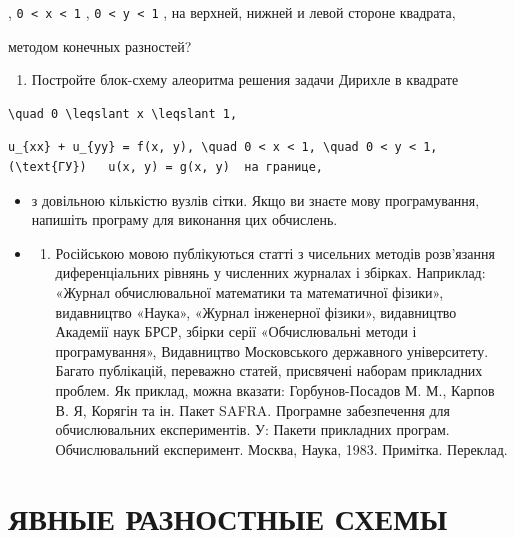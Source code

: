 \documentclass[
  ukrainian,
]{article}
\providecommand{\tightlist}{%
  \setlength{\itemsep}{0pt}\setlength{\parskip}{0pt}}
\begin{document}
, \texttt{0\ \textless{}\ x\ \textless{}\ 1} ,
\texttt{0\ \textless{}\ y\ \textless{}\ 1} , на верхней, нижней и левой
стороне квадрата,

методом конечных разностей?

\begin{enumerate}
\def\labelenumi{\arabic{enumi}.}
\setcounter{enumi}{5}
\tightlist
\item
  Постройте блок-схему алеоритма решения задачи Дирихле в квадрате
\end{enumerate}

\begin{verbatim}
\quad 0 \leqslant x \leqslant 1,
\end{verbatim}

\begin{verbatim}
u_{xx} + u_{yy} = f(x, y), \quad 0 < x < 1, \quad 0 < y < 1,   (\text{ГУ})   u(x, y) = g(x, y)  на границе,
\end{verbatim}

\begin{itemize}
\item
  з довільною кількістю вузлів сітки. Якщо ви знаєте мову програмування,
  напишіть програму для виконання цих обчислень.
\item
  \begin{enumerate}
  \def\labelenumi{\arabic{enumi})}
  \tightlist
  \item
    Російською мовою публікуються статті з чисельних методів розв'язання
    диференціальних рівнянь у численних журналах і збірках. Наприклад:
    «Журнал обчислювальної математики та математичної фізики»,
    видавництво «Наука», «Журнал інженерної фізики», видавництво
    Академії наук БРСР, збірки серії «Обчислювальні методи і
    програмування», Видавництво Московського державного університету.
    Багато публікацій, переважно статей, присвячені наборам прикладних
    проблем. Як приклад, можна вказати: Горбунов-Посадов М. М., Карпов
    В. Я, Корягін та ін. Пакет SAFRA. Програмне забезпечення для
    обчислювальних експериментів. У: Пакети прикладних програм.
    Обчислювальний експеримент. Москва, Наука, 1983. Примітка. Переклад.
  \end{enumerate}
\end{itemize}

\section{ЯВНЫЕ РАЗНОСТНЫЕ
СХЕМЫ}\label{ux44fux432ux43dux44bux435-ux440ux430ux437ux43dux43eux441ux442ux43dux44bux435-ux441ux445ux435ux43cux44b}
\end{document}
